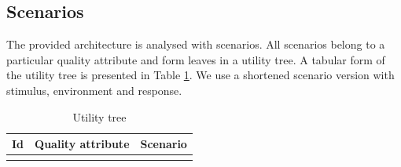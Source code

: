 \documentclass{llncs}
\begin{document}
\subsection{Scenarios}
\label{sec:scenarios}
The provided architecture is analysed with scenarios. All scenarios belong to a particular quality attribute and form leaves in a utility tree. A tabular  form of the utility tree is presented in Table \ref{tbl:utilitytree}. We use a shortened scenario version \cite{bass2012softwareArchitecture} with stimulus, environment and response.
\begin{table}
	\setlength{\tabcolsep}{0.3em}	
	\caption{Utility tree}
	\label{tbl:utilitytree}
	\begin{center}
		\begin{tabular}{c | p{2.2cm} | c}
			\hline			
			Id &
			Quality \newline attribute&	Scenario \\		
			\hline

\end{tabular}
\end{center}
\end{table}
\end{document}
